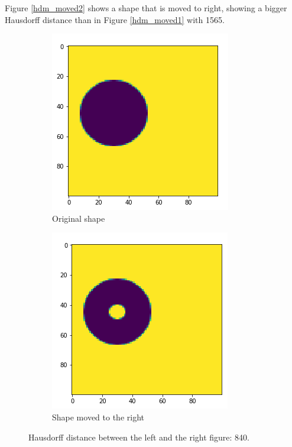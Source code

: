 Figure \ref{hdm_moved2} shows a shape that is moved to right, showing a bigger Hausdorff distance than in Figure \ref{hdm_moved1} with 1565.

\begin{figure}[H]
    \centering
    \begin{subfigure}{.5\textwidth}
        \centering
        \includegraphics[width=.75\linewidth]{chapters/06_hdm/images/hdm_original.png}
        \caption{Original shape}
    \end{subfigure}%
    \begin{subfigure}{.5\textwidth}
        \centering
        \includegraphics[width=.75\linewidth]{chapters/06_hdm/images/hdm_hole.png}
        \caption{Shape moved to the right}
    \end{subfigure}
    \caption{Hausdorff distance between the left and the right figure: 840. }
    \label{hdm_hole}
\end{figure}

